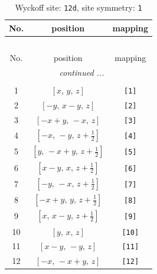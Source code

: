 \documentclass[fleqn,8pt]{jsarticle}
\begin{document}
\begin{longtable}{ccc}
\caption{Wyckoff site: {\tt 12d}, site symmetry: {\tt 1}}
 \\
 \hline \hline
No. & position & mapping \\ \hline \endfirsthead

\multicolumn{2}{l}{\tablename\ \thetable{}} \\
 \hline \hline
No. & position & mapping \\ \hline \endhead

 \hline \hline
\multicolumn{2}{r}{\footnotesize\it continued ...} \\ \endfoot

 \hline \hline
\multicolumn{2}{r}{} \\ \endlastfoot

1 & $\left[ x,\, y,\, z \right]$ & {\tt [1]} \\ \hline
2 & $\left[ - y,\, x - y,\, z \right]$ & {\tt [2]} \\ \hline
3 & $\left[ - x + y,\, - x,\, z \right]$ & {\tt [3]} \\ \hline
4 & $\left[ - x,\, - y,\, z + \frac{1}{2} \right]$ & {\tt [4]} \\ \hline
5 & $\left[ y,\, - x + y,\, z + \frac{1}{2} \right]$ & {\tt [5]} \\ \hline
6 & $\left[ x - y,\, x,\, z + \frac{1}{2} \right]$ & {\tt [6]} \\ \hline
7 & $\left[ - y,\, - x,\, z + \frac{1}{2} \right]$ & {\tt [7]} \\ \hline
8 & $\left[ - x + y,\, y,\, z + \frac{1}{2} \right]$ & {\tt [8]} \\ \hline
9 & $\left[ x,\, x - y,\, z + \frac{1}{2} \right]$ & {\tt [9]} \\ \hline
10 & $\left[ y,\, x,\, z \right]$ & {\tt [10]} \\ \hline
11 & $\left[ x - y,\, - y,\, z \right]$ & {\tt [11]} \\ \hline
12 & $\left[ - x,\, - x + y,\, z \right]$ & {\tt [12]} \\
\end{longtable}
\end{document}
